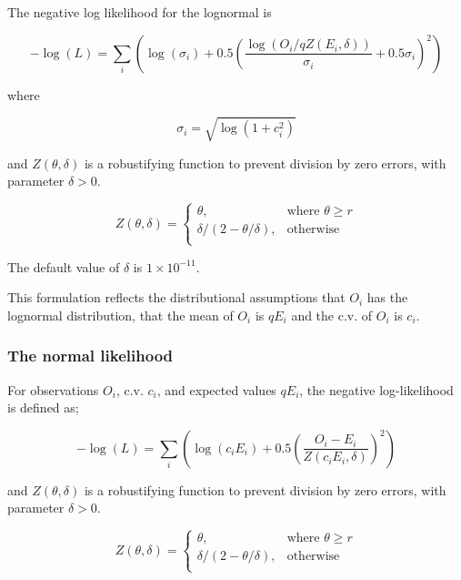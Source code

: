 The negative log likelihood for the lognormal is

\begin{equation}
- \log \left(L \right) = \sum\limits_i \left( \log \left( \sigma _i \right) + 0.5\left( \frac{\log \left(O_i / q Z \left(E_i,\delta \right) \right)}{\sigma_i} + 0.5 \sigma_i \right)^2 \right)
\end{equation}

where

\begin{equation}
\sigma_i  = \sqrt{\log \left(1+c_i^2 \right)}
\end{equation}

and $Z \left(\theta,\delta \right)$ is a robustifying function to prevent division by zero errors, with parameter $\delta>0$.

\begin{equation}
Z \left(\theta,\delta \right) = \begin{cases}
\theta, & \text{where $\theta \ge r$} \\
\delta/\left( 2-\theta/\delta \right), & \text{otherwise} \\
\end{cases}
\end{equation}

The default value of $\delta$ is $1 \times 10^{-11}$.

This formulation reflects the distributional assumptions that  $O_i$ has the lognormal distribution, that the mean of $O_i$ is $qE_i$  and the c.v. of $O_i$ is $c_i$.

\subsubsection*{The normal likelihood}

For observations $O_i$, c.v. $c_i$, and expected values $qE_i$, the negative log-likelihood is defined as;

\begin{equation}
- \log \left(L \right) = \sum\limits_i \left( \log \left( c_i E_i \right) +0.5 \left( \frac{O_i-E_i}{Z\left(c_i E_i,\delta \right)}\right)^2\right)
\end{equation}

and $Z \left(\theta,\delta \right)$ is a robustifying function to prevent division by zero errors, with parameter $\delta>0$.

\begin{equation}
Z \left(\theta,\delta \right) = \begin{cases}
\theta, & \text{where $\theta \ge r$} \\
\delta/\left( 2-\theta/\delta \right), & \text{otherwise} \\
\end{cases}
\end{equation}

